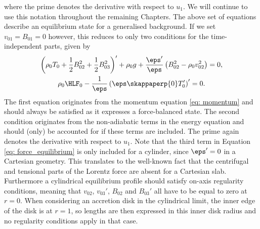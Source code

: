 where the prime denotes the derivative with respect to $u_1$. We will continue to use this notation throughout the remaining Chapters. The above set of equations describe an equilibrium state for a generalised background. If we set $v_{01} = B_{01} = 0$ however, this reduces to only two conditions for the time-independent parts, given by
\begin{gather}
  \left(\rho_0 T_0 + \frac{1}{2}B_{02}^2 + \frac{1}{2}B_{03}^2\right)'
    + \rho_0 g
    + \frac{\eps'}{\eps}\left(B_{02}^2 - \rho_0 v_{02}^2\right) = 0, \label{eq: force_equilibrium} \\
  \rho_0 \HLF_0 - \frac{1}{\eps}\left(\eps \skappaperp{0} T_0'\right)' = 0. \label{eq: thermal_equilibrium}
\end{gather}
The first equation originates from the momentum equation \eqref{eq: momentum} and should always be satisfied as it expresses a force-balanced state. The second condition originates from the non-adiabatic terms in the energy equation and should (only) be accounted for if these terms are included. The prime again denotes the derivative with respect to $u_1$. Note that the third term in Equation \eqref{eq: force_equilibrium} is only included for a cylinder, since $\eps' = 0$ in a Cartesian geometry. This translates to the well-known fact that the centrifugal and tensional parts of the Lorentz force are absent for a Cartesian slab. Furthermore a cylindrical equilibrium profile should satisfy on-axis regularity conditions, meaning that $v_{02}$, $v_{03}'$, $B_{02}$ and $B_{03}'$ all have to be equal to zero at $r = 0$. When considering an accretion disk in the cylindrical limit, the inner edge of the disk is at $r = 1$, so lengths are then expressed in this inner disk radius and no regularity conditions apply in that case.

